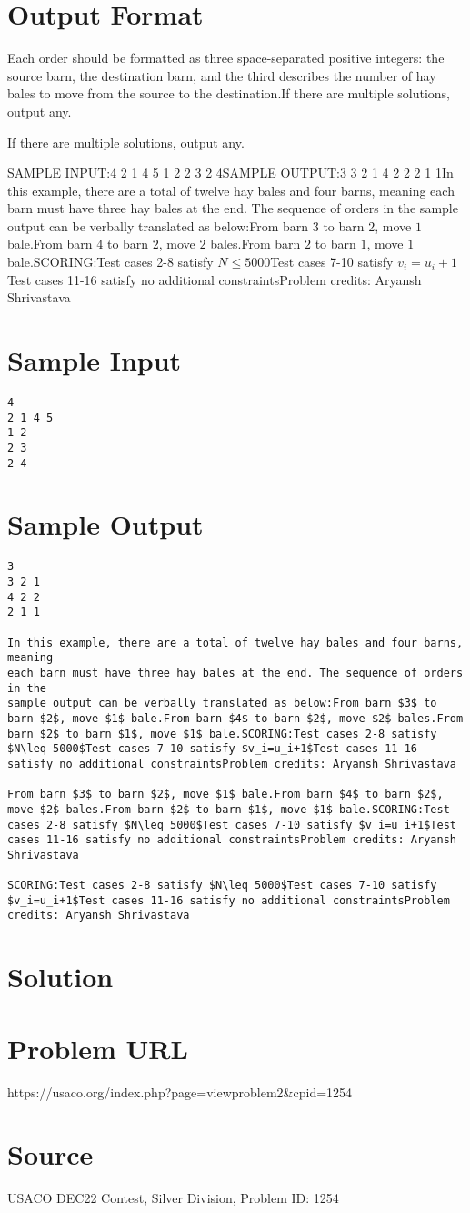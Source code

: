 \documentclass[12pt]{article}
\begin{document}
\section*{Output Format}
Each order should be formatted as three space-separated positive integers: the
source barn, the destination barn, and the third describes the number of hay
bales to move from the source to the destination.If there are multiple solutions, output any.

If there are multiple solutions, output any.

SAMPLE INPUT:4
2 1 4 5
1 2
2 3
2 4SAMPLE OUTPUT:3
3 2 1
4 2 2
2 1 1In this example, there are a total of twelve hay bales and four barns, meaning
each barn must have three hay bales at the end. The sequence of orders in the
sample output can be verbally translated as below:From barn $3$ to barn $2$, move $1$ bale.From barn $4$ to barn $2$, move $2$ bales.From barn $2$ to barn $1$, move $1$ bale.SCORING:Test cases 2-8 satisfy $N\leq 5000$Test cases 7-10 satisfy $v_i=u_i+1$Test cases 11-16 satisfy no additional constraintsProblem credits: Aryansh Shrivastava

\section*{Sample Input}
\begin{verbatim}
4
2 1 4 5
1 2
2 3
2 4
\end{verbatim}

\section*{Sample Output}
\begin{verbatim}
3
3 2 1
4 2 2
2 1 1

In this example, there are a total of twelve hay bales and four barns, meaning
each barn must have three hay bales at the end. The sequence of orders in the
sample output can be verbally translated as below:From barn $3$ to barn $2$, move $1$ bale.From barn $4$ to barn $2$, move $2$ bales.From barn $2$ to barn $1$, move $1$ bale.SCORING:Test cases 2-8 satisfy $N\leq 5000$Test cases 7-10 satisfy $v_i=u_i+1$Test cases 11-16 satisfy no additional constraintsProblem credits: Aryansh Shrivastava

From barn $3$ to barn $2$, move $1$ bale.From barn $4$ to barn $2$, move $2$ bales.From barn $2$ to barn $1$, move $1$ bale.SCORING:Test cases 2-8 satisfy $N\leq 5000$Test cases 7-10 satisfy $v_i=u_i+1$Test cases 11-16 satisfy no additional constraintsProblem credits: Aryansh Shrivastava

SCORING:Test cases 2-8 satisfy $N\leq 5000$Test cases 7-10 satisfy $v_i=u_i+1$Test cases 11-16 satisfy no additional constraintsProblem credits: Aryansh Shrivastava
\end{verbatim}

\section*{Solution}


\section*{Problem URL}
https://usaco.org/index.php?page=viewproblem2&cpid=1254

\section*{Source}
USACO DEC22 Contest, Silver Division, Problem ID: 1254
\end{document}
